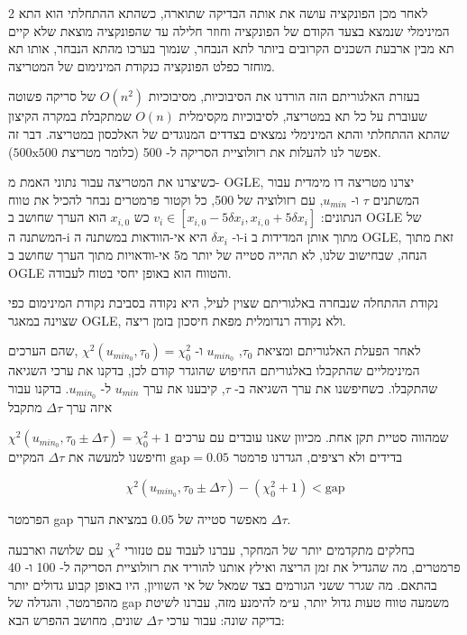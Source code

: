 \documentclass{article}
\begin{document}
\begin{multicols}{2}
 לאחר מכן הפונקציה עושה את אותה הבדיקה שתוארה, כשהתא ההתחלתי הוא התא המינימלי שנמצא בצעד הקודם של הפונקציה
 וחוזר חלילה עד שהפונקציה מוצאת שלא קיים תא מבין ארבעת השכנים הקרובים ביותר לתא הנבחר, שנמוך בערכו מהתא הנבחר, 
 אותו תא מוחזר כפלט הפונקציה כנקודת המינימום של המטריצה.

 בעזרת האלגוריתם הזה הורדנו את הסיבוכיות, מסיבוכיות 
 $O(n^2)$
של סריקה פשוטה שעוברת על כל תא במטריצה,
לסיבוכיות מקסימלית
$O(n)$
שמתקבלת במקרה הקיצון שהתא ההתחלתי והתא המינימלי נמצאים בצדדים המנוגדים של האלכסון במטריצה.
דבר זה אפשר לנו להעלות את רזולוציית הסריקה ל-
500
(כלומר מטריצת
$500\text{x}500$).



כשיצרנו את המטריצה עבור נתוני האמת מ-
\textenglish{OGLE},
יצרנו מטריצה דו מימדית
עבור המשתנים 
$\tau$
ו-
$u_{min}$,
עם רזולוציה של 500,
כל וקטור פרמטרים
נבחר להכיל את טווח הנתונים:
$v_i \in [x_{i,0}-5\delta x_i ,x_{i,0}+5\delta x_i]$
כש
$x_{i,0}$
הוא הערך שחושב 
ב
\textenglish{OGLE}
של המשתנה ה-i
ו-
$\delta x_i$
היא אי-הוודאות במשתנה ה-i
מתוך אותן המדידות ב
\textenglish{OGLE},
זאת מתוך הנחה, שבחישוב שלנו, לא תהייה סטייה של יותר מ5 אי-וודאויות מתוך הערך שחושב ב
\textenglish{OGLE}
והטווח הוא באופן יחסי בטוח לעבודה.

נקודת ההתחלה שנבחרה באלגוריתם שצוין לעיל,
היא נקודה בסביבת נקודת המינימום כפי שצוינה במאגר 
\textenglish{OGLE},
ולא נקודה רנדומלית מפאת חיסכון בזמן ריצה.

לאחר
הפעלת האלגוריתם
ומציאת 
$\tau_0$,
$u_{min_0}$
ו-
$\chi^2(u_{min_0},\tau_0)=\chi^2_0$
,שהם הערכים המינימליים שהתקבלו באלגוריתם החיפוש שהוגדר קודם לכן,
בדקנו את ערכי השגיאה שהתקבלו.
כשחיפשנו את ערך השגיאה ב-
$\tau$,
קיבענו את ערך 
$u_{min}$
ל-
$u_{min_0}$.
בדקנו עבור איזה ערך
$\Delta\tau$
מתקבל

\mbox{$\chi^2(u_{min_0},\tau_0 \pm \Delta\tau)=\chi^2_0 +1 $}
שמהווה סטיית תקן
אחת.
מכיוון שאנו עובדים עם ערכים בדידים ולא רציפים,
הגדרנו פרמטר 
$\text{gap}=0.05$
וחיפשנו למעשה את 
$\Delta\tau$
המקיים

\begin{equation}
    \chi^2(u_{min_0},\tau_0 \pm \Delta\tau)-(\chi^2_0 +1)  < \text{gap}
\end{equation}

הפרמטר 
\textenglish{gap}
מאפשר סטייה של 
$0.05$
במציאת הערך 
$\Delta\tau$.

בחלקים מתקדמים יותר של המחקר, עברנו לעבוד עם טנזורי 
$\chi^2$
עם שלושה וארבעה פרמטרים, מה שהגדיל את זמן הריצה 
ואילץ אותנו להוריד את רזולוציית הסריקה ל-
100 
ו-
40 בהתאם.
מה שגרר ששני הגורמים בצד שמאל של אי השוויון, היו באופן 
קבוע גדולים יותר מהפרמטר,
והגדלה של
\textenglish{gap}
משמעה טווח טעות גדול יותר,
ע״מ להימנע מזה, עברנו לשיטת בדיקה שונה:
עבור ערכי
$\Delta \tau$
שונים,
מחושב ההפרש הבא:


\end{multicols}
\end{document}
